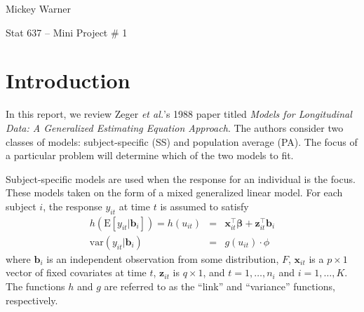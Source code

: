 \documentclass[12pt]{article}
\newcommand{\m}[1]{\mathbf{\bm{#1}}}
\newcommand{\E}{\mathrm{E}}
\newcommand{\var}{\mathrm{var}}
\begin{document}
\noindent Mickey Warner
\bigskip

\noindent Stat 637 -- Mini Project \# 1

\section*{Introduction}

\noindent In this report, we review Zeger \emph{et al.}'s 1988 paper titled \emph{Models for Longitudinal Data: A Generalized Estimating Equation Approach}. The authors consider two classes of models: subject-specific (SS) and population average (PA). The focus of a particular problem will determine which of the two models to fit.
\bigskip

\noindent Subject-specific models are used when the response for an individual is the focus. These models taken on the form of a mixed generalized linear model. For each subject $i$, the response $y_{it}$ at time $t$ is assumed to satisfy
\begin{eqnarray}
h(\E[y_{it}|\m{b}_i]) = h(u_{it}) &=& \m{x}_{it}^\top\m{\beta} + \m{z}_{it}^\top\m{b}_i \\
\var(y_{it}|\m{b}_i) &=& g(u_{it})\cdot \phi
\end{eqnarray}
where $\m{b}_i$ is an independent observation from some distribution, $F$, $\m{x}_{it}$ is a $p\times 1$ vector of fixed covariates at time $t$, $\m{z}_{it}$ is $q\times 1$, and $t=1,\ldots,n_i$ and $i=1,\ldots,K$. The functions $h$ and $g$ are referred to as the ``link'' and ``variance'' functions, respectively.
\end{document}
